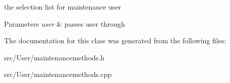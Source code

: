 the selection list for maintenance user 


\begin{DoxyParams}{Parameters}
{\em user} & passes user through \\
\hline
\end{DoxyParams}


The documentation for this class was generated from the following files\-:\begin{DoxyCompactItemize}
\item 
src/\-User/maintenancemethods.\-h\item 
src/\-User/maintenancemethods.\-cpp\end{DoxyCompactItemize}
